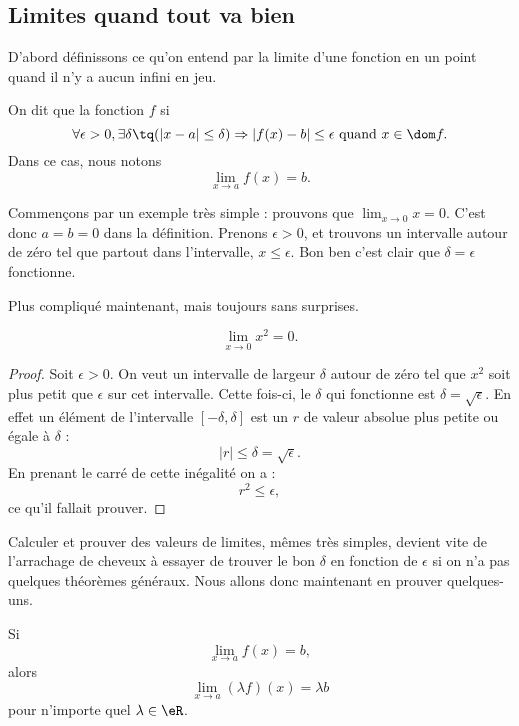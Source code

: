 \subsection{Limites quand tout va bien}

D'abord définissons ce qu'on entend par la limite d'une fonction en un point quand il n'y a aucun infini en jeu.
\begin{definition}      \label{DefLimPointSansInfini}
 On dit que la fonction $f$  si
\[
  \forall \epsilon>0,\exists\delta\tq (| x-a |\leq\delta)\Rightarrow | f(x)-b |\leq \epsilon\text{ quand }x\in\dom f.
\]
Dans ce cas, nous notons
\begin{equation}
\lim_{x\to a}f(x)=b.
\end{equation}
\end{definition}

Commençons par un exemple très simple : prouvons que $\lim_{x\to 0}x=0$. C'est donc $a=b=0$ dans la définition. Prenons $\epsilon>0$, et trouvons un intervalle autour de zéro tel que partout dans l'intervalle, $x\leq \epsilon$. Bon ben c'est clair que $\delta=\epsilon$ fonctionne.

Plus compliqué maintenant, mais toujours sans surprises.

\begin{proposition}
\[
  \lim_{x\to 0}x^2=0.
\]

\end{proposition}

\begin{proof}
Soit $\epsilon>0$. On veut un intervalle de largeur $\delta$ autour de zéro tel que $x^2$ soit plus petit que $\epsilon$ sur cet intervalle. Cette fois-ci, le $\delta$ qui fonctionne est $\delta=\sqrt{\epsilon}$. En effet un élément de l'intervalle $[-\delta,\delta]$ est un $r$ de valeur absolue plus petite ou égale à $\delta$ :
\[
| r |\leq\delta=\sqrt{\epsilon}.
\]
En prenant le carré de cette inégalité on a :
\[
  r^2\leq\epsilon,
\]
ce qu'il fallait prouver.
\end{proof}


Calculer et prouver des valeurs de limites, mêmes très simples, devient vite de l'arrachage de cheveux à essayer de trouver le bon $\delta$ en fonction de $\epsilon$ si on n'a pas quelques théorèmes généraux. Nous allons donc maintenant en prouver quelques-uns.

\begin{theorem}     \label{ThoLimLinMul}
    Si
    \begin{equation} \label{Eqhypmullimlin}
      \lim_{x\to a}f(x)=b,
    \end{equation}
    alors
    \begin{equation} \label{Eqbutmultlim}
      \lim_{x\to a}(\lambda f)(x)=\lambda b
    \end{equation}
    pour n'importe quel $\lambda\in\eR$.
\end{theorem}

